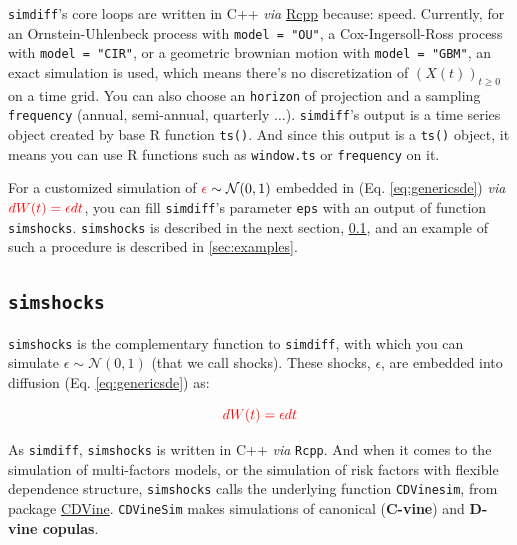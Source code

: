 \documentclass[a4paper]{article}\usepackage[]{graphicx}\usepackage[]{color}
\newcommand{\proglang}[1]{\textsf{#1}}
\newcommand{\code}[1]{\mbox{\texttt{#1}}}
\newcommand{\MN}{\mathcal{N}}
\begin{document}
\medskip

\code{simdiff}'s core loops are written in C++ \textit{via} \href{http://cran.r-project.org/web/packages/Rcpp/index.html}{Rcpp} because: speed.  Currently, for an Ornstein-Uhlenbeck process with \code{model = "OU"}, a Cox-Ingersoll-Ross process with \code{model = "CIR"}, or a geometric brownian motion with \code{model = "GBM"}, an exact simulation is used, which means there's no discretization of $(X(t))_{t \geq 0}$ on a time grid. You can also choose an \code{horizon} of projection and a sampling \code{frequency} (annual, semi-annual, quarterly $\ldots$). \code{simdiff}'s output is a time series object created by base \proglang{R} function \code{ts()}. And since this output is a \code{ts()} object, it means you can use \proglang{R} functions such as \code{window.ts} or \code{frequency} on it. 

\medskip

For a customized simulation of $\textcolor{red}{\epsilon} \sim \MN(0, 1)$ embedded in (Eq. \ref{eq:genericsde}) \textit{via} $\textcolor{red}{dW(t) = \epsilon dt}$, you can fill \code{simdiff}'s parameter \code{eps} with an output of function \code{simshocks}. \code{simshocks} is described in the next section, \ref{sec:simshocks}, and an example of such a procedure is described in \ref{sec:examples}.


\subsection{\code{simshocks}}
\label{sec:simshocks}

\code{simshocks} is the complementary function to \code{simdiff}, with which you can simulate  $\epsilon \sim \MN(0, 1)$ (that we call shocks). These shocks, $\epsilon$, are embedded into diffusion (Eq. \ref{eq:genericsde}) as:

\begin{equation}
\textcolor{red}{dW(t) = \epsilon dt}
\end{equation}

\medskip

As \code{simdiff}, \code{simshocks} is written in C++ \textit{via} \code{Rcpp}. And when it comes to the simulation of multi-factors models, or the simulation of risk factors with flexible dependence structure, \code{simshocks} calls the underlying function \code{CDVinesim}, from package \href{http://cran.r-project.org/web/packages/CDVine/index.html}{CDVine}. \code{CDVineSim} makes simulations of canonical ({\bf C-vine}) and {\bf D-vine copulas}. 
\end{document}
